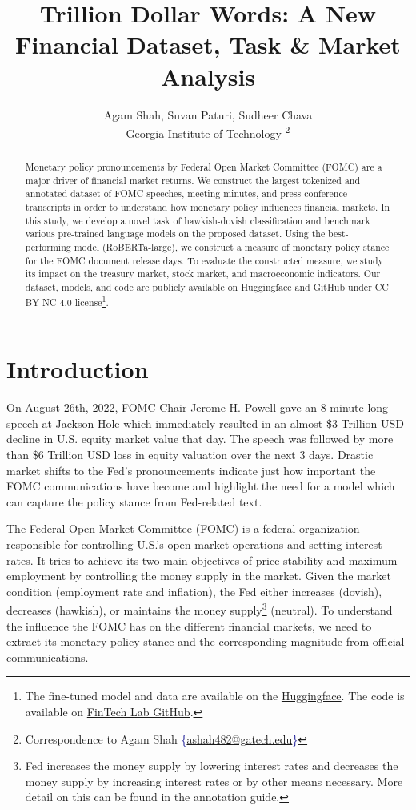 \documentclass[11pt]{article}
\title{Trillion Dollar Words: A New Financial Dataset, Task \& Market Analysis}
\author{\hypersetup{linkcolor=black} Agam Shah\;, Suvan Paturi\;, Sudheer Chava\\
Georgia Institute of Technology
\thanks{Correspondence to Agam Shah \textcolor{darkblue}{{\{\href{mailto:ashah482@gatech.edu}{ashah482@gatech.edu}\}}}}}
\begin{document}
\maketitle
\begin{abstract}
 Monetary policy pronouncements by Federal Open Market Committee (FOMC) are a major driver of financial market returns. We construct the largest tokenized and annotated dataset of FOMC speeches, meeting minutes, and press conference transcripts in order to understand how monetary policy influences financial markets. In this study, we develop a novel task of hawkish-dovish classification and benchmark various pre-trained language models on the proposed dataset. Using the best-performing model (RoBERTa-large), we construct a measure of monetary policy stance for the FOMC document release days. To evaluate the constructed measure, we study its impact on the treasury market, stock market, and macroeconomic indicators. Our dataset, models, and code are publicly available on Huggingface and GitHub under CC BY-NC 4.0 license\footnote{The fine-tuned model and data are available on the \href{https://huggingface.co/gtfintechlab/FOMC-RoBERTa}{Huggingface}. The code is available on \href{https://github.com/gtfintechlab/fomc-hawkish-dovish}{FinTech Lab GitHub}.}. 


\end{abstract}

\section{Introduction}

On August 26th, 2022, FOMC Chair Jerome H. Powell gave an 8-minute long speech at Jackson Hole which immediately resulted in an almost \$3 Trillion USD decline in U.S. equity market value that day. The speech was followed by more than \$6 Trillion USD loss in equity valuation over the next 3 days. Drastic market shifts to the Fed's pronouncements indicate just how important the FOMC communications have become and highlight the need for a model which can capture the policy stance from Fed-related text. 

The Federal Open Market Committee (FOMC) is a federal organization responsible for controlling U.S.'s open market operations and setting interest rates. It tries to achieve its two main objectives of price stability and maximum employment by controlling the money supply in the market. Given the market condition (employment rate and inflation), the Fed either increases (dovish), decreases (hawkish), or maintains the money supply\footnote{Fed increases the money supply by lowering interest rates and decreases the money supply by increasing interest rates or by other means necessary. More detail on this can be found in the annotation guide. } (neutral). To understand the influence the FOMC has on the different financial markets, we need to extract its monetary policy stance and the corresponding magnitude from official communications. 
\end{document}
